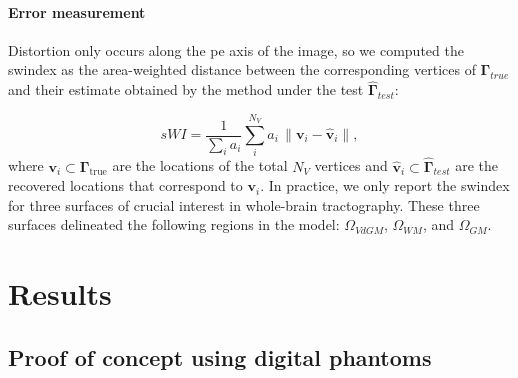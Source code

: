 \documentclass[3p,authoryear,fleqn]{elsarticle}
\providecommand{\gammaset}{\ensuremath{\boldsymbol{\Gamma}}}
\renewcommand{\vec}[1]{\mathbf{#1}}
\begin{document}
\paragraph*{Error measurement}\label{sec:experiments_evaluation}
Distortion only occurs along the \gls*{pe} axis of the image, so we computed the
  \gls*{swindex} as the area-weighted distance between the corresponding vertices of 
  $\gammaset_{true}$ and their estimate obtained by the method under the test $\hat{\gammaset}_{test}$:

  \begin{equation}
  sWI = \frac{1}{\sum_i a_i} \sum\limits_i^{N_V} a_i\,\|
  \vec{v}_i - \hat{\vec{v}}_i \|,
  \label{eq:swindex}
  \end{equation}
  where $\vec{v}_i \subset \gammaset_\text{true}$ are the locations of the total $N_V$ vertices
  and $\hat{\vec{v}}_i \subset \hat{\gammaset}_{test}$ are the recovered locations
  that correspond to $\vec{v}_i$.
In practice, we only report the \gls*{swindex} for three surfaces of crucial interest in whole-brain
  tractography.
These three surfaces delineated the following regions in the model: $\Omega_{VdGM}$, $\Omega_{WM}$, and $\Omega_{GM}$.  
\makeatletter{}\section{Results}
\label{sec:results}

\subsection{Proof of concept using digital phantoms}
\label{sec:results_phantom}
\end{document}
